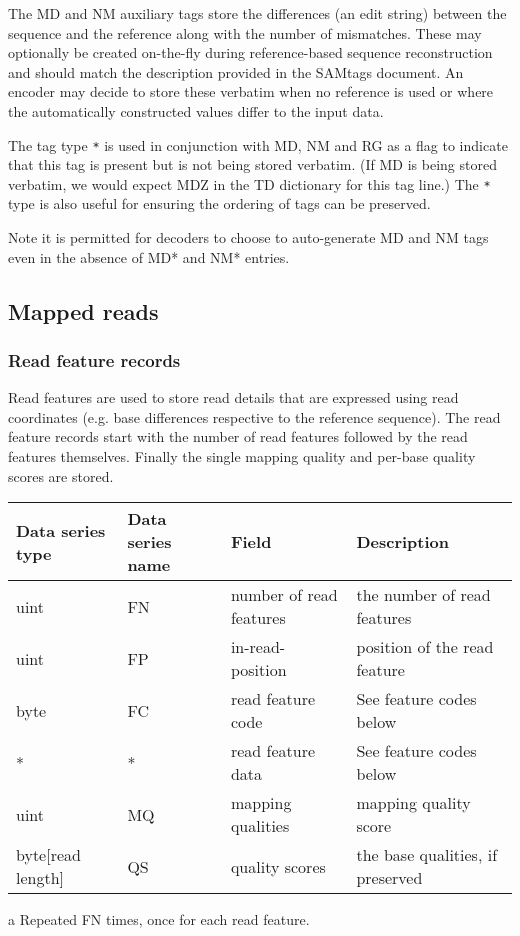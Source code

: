 \documentclass[a4paper]{article}
\begin{document}
The MD and NM auxiliary tags store the differences (an edit string) between the sequence and the reference along with the number of mismatches.
These may optionally be created on-the-fly during reference-based sequence reconstruction and should match the description provided in the SAMtags document.
An encoder may decide to store these verbatim when no reference is used or where the automatically constructed values differ to the input data.

The tag type \texttt{*} is used in conjunction with MD, NM and RG as a flag to indicate that this tag is present but is not being stored verbatim.
(If MD is being stored verbatim, we would expect MDZ in the TD dictionary for this tag line.)
The \texttt{*} type is also useful for ensuring the ordering of tags can be preserved.

Note it is permitted for decoders to choose to auto-generate MD and NM tags even in the absence of MD* and NM* entries.

\subsection{Mapped reads}
\label{subsec:mapped}

\subsubsection*{Read feature records}
\label{subsec:features}

Read features are used to store read details that are expressed using read coordinates 
(e.g. base differences respective to the reference sequence). The read feature 
records start with the number of read features followed by the read features themselves.
Finally the single mapping quality and per-base quality scores are stored.

\begin{threeparttable}[t]
\begin{tabular}{|>{\raggedright}p{88pt}|>{\raggedright}p{83pt}|>{\raggedright}p{85pt}|>{\raggedright}p{180pt}|}
\hline
\textbf{Data series type} & \textbf{Data series name} & \textbf{Field} & \textbf{Description}\tabularnewline
\hline
uint & FN & number of read features & the number of read features\tabularnewline
\hline
uint & FP & in-read-position\tnote{a} & position of the read feature\tabularnewline 
\hline
byte & FC & read feature code\tnote{a} & See feature codes below\tabularnewline
\hline
* & * & read feature data\tnote{a} & See feature codes below\tabularnewline
\hline
uint & MQ & mapping qualities & mapping quality score\tabularnewline
\hline
byte[read length] & QS & quality scores & the base qualities, if preserved\tabularnewline
\hline
\end{tabular}
\begin{tablenotes}
\item[a] Repeated FN times, once for each read feature.
\end{tablenotes}
\end{threeparttable}
\end{document}
